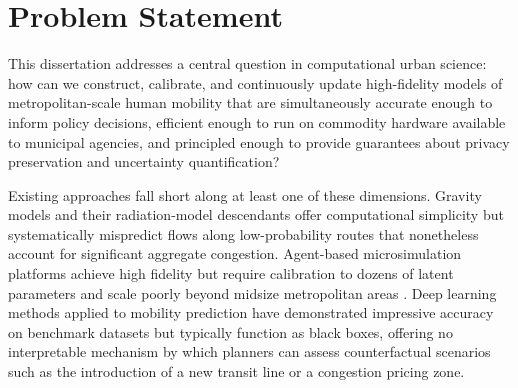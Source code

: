 \section{Problem Statement}

This dissertation addresses a central question in computational urban science: how can we construct, calibrate, and continuously update high-fidelity models of metropolitan-scale human mobility that are simultaneously accurate enough to inform policy decisions, efficient enough to run on commodity hardware available to municipal agencies, and principled enough to provide guarantees about privacy preservation and uncertainty quantification?

Existing approaches fall short along at least one of these dimensions. Gravity models and their radiation-model descendants \cite{simini2012universal} offer computational simplicity but systematically mispredict flows along low-probability routes that nonetheless account for significant aggregate congestion. Agent-based microsimulation platforms achieve high fidelity but require calibration to dozens of latent parameters and scale poorly beyond midsize metropolitan areas \cite{balmer2007agent}. Deep learning methods applied to mobility prediction have demonstrated impressive accuracy on benchmark datasets but typically function as black boxes, offering no interpretable mechanism by which planners can assess counterfactual scenarios such as the introduction of a new transit line or a congestion pricing zone.
